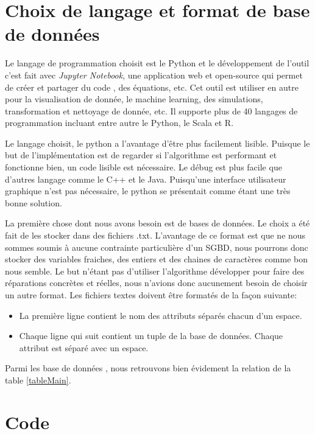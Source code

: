 \documentclass[letterpaper, 12pt]{report}
\theoremstyle{definition}
\begin{document}
\section{Choix de langage et format de base de données}

Le langage de programmation choisit est le Python et le développement de l'outil c'est fait avec \emph{Jupyter Notebook}, une application web et open-source qui permet de créer et partager du code , des équations, etc. Cet outil est utiliser en autre pour la visualisation de donnée, le machine learning, des simulations, transformation et nettoyage de donnée, etc. Il supporte plus de 40 langages de programmation incluant entre autre le Python, le Scala et R.

Le langage choisit, le python a l'avantage d'être plus facilement lisible. Puisque le but de l'implémentation est de regarder si l'algorithme est performant et fonctionne bien, un code lisible est nécessaire. Le débug est plus facile que d'autres langage comme le C++ et le Java. Puisqu'une interface utilisateur graphique n'est pas nécessaire, le python se présentait comme étant une très bonne solution.

La première chose dont nous avons besoin est de bases de données. Le choix a été fait de les stocker dans des fichiers .txt. L'avantage de ce format est que ne nous sommes soumis à aucune contrainte particulière d'un SGBD, nous pourrons donc stocker des variables fraiches, des entiers et des chaines de caractères comme bon nous semble. Le but n'étant pas d'utiliser l'algorithme développer pour faire des réparations concrètes et réelles, nous n'avions donc aucunement besoin de choisir un autre format. Les fichiers textes doivent être formatés de la façon suivante:
\begin{itemize}


\item La première ligne contient le nom des attributs séparés chacun d'un espace.
\item Chaque ligne qui suit contient un tuple de la base de données. Chaque attribut est séparé avec un espace.

\end{itemize}

Parmi les base de données , nous retrouvons bien évidement la relation de la table \ref{tableMain}.

\section{Code}
\end{document}
